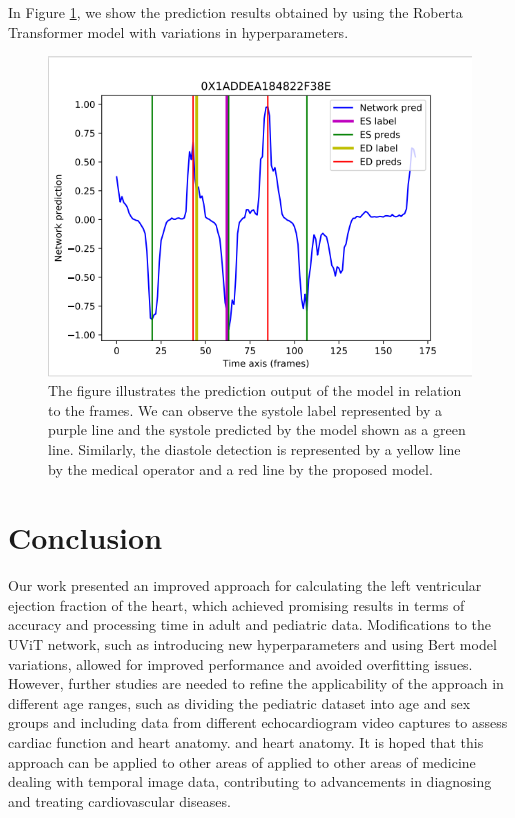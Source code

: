 \documentclass[a4paper,fleqn]{cas-dc}
\begin{document}
In Figure \ref{FIG:2}, we show the prediction results obtained by using the Roberta Transformer model with variations in hyperparameters.

\begin{figure}
	\centering
		\includegraphics[scale=.60]{saida1.png}
	\caption{The figure illustrates the prediction output of the model in relation to the frames. We can observe the systole label represented by a purple line and the systole predicted by the model shown as a green line. Similarly, the diastole detection is represented by a yellow line by the medical operator and a red line by the proposed model.}
	\label{FIG:2}
\end{figure}



\section{Conclusion} \label{sec:5}

Our work presented an improved approach for calculating the left ventricular ejection fraction of the heart, which achieved promising results in terms of accuracy and processing time in adult and pediatric data. Modifications to the UViT network, such as introducing new hyperparameters and using Bert model variations, allowed for improved performance and avoided overfitting issues. However, further studies are needed to refine the applicability of the approach in different age ranges, such as dividing the pediatric dataset into age and sex groups and including data from different echocardiogram video captures to assess cardiac function and heart anatomy. and heart anatomy. It is hoped that this approach can be
applied to other areas of  applied to other areas of medicine dealing with temporal image data, contributing to advancements in diagnosing and treating cardiovascular diseases.


%
%

 


\end{document}
